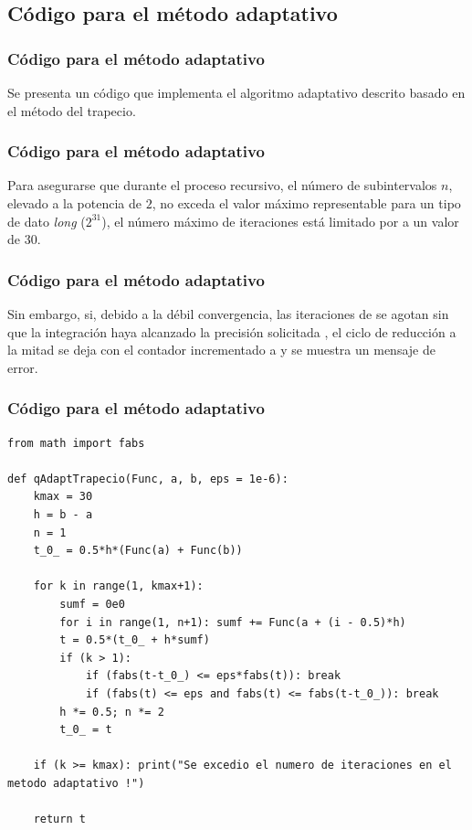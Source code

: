 \subsection*{Código para el método adaptativo}
\begin{frame}
\frametitle{Código para el método adaptativo}
Se presenta un código que implementa el algoritmo adaptativo descrito basado en el método del trapecio.
\end{frame}
\begin{frame}
\frametitle{Código para el método adaptativo}
Para asegurarse que durante el proceso recursivo, el número de subintervalos $n$, elevado a la potencia de $2$, no exceda el valor máximo representable para un tipo de dato \emph{long} ($2^{31}$), el número máximo de iteraciones está limitado por  a un valor de 30.
\end{frame}
\begin{frame}
\frametitle{Código para el método adaptativo}
Sin embargo, si, debido a la débil convergencia, las iteraciones de  se agotan sin que la integración haya alcanzado la precisión solicitada , el ciclo de reducción a la mitad se deja con el contador  incrementado a  y se muestra un mensaje de error.
\end{frame}
\begin{frame}
\frametitle{Código para el método adaptativo}
\begin{lstlisting}[caption=Código para el método adaptativo del trapecio, style=FormattedNumber, basicstyle=\linespread{1.1}\ttfamily=\small, columns=fullflexible]
from math import fabs

def qAdaptTrapecio(Func, a, b, eps = 1e-6):
    kmax = 30
    h = b - a
    n = 1
    t_0_ = 0.5*h*(Func(a) + Func(b))

    for k in range(1, kmax+1):
        sumf = 0e0
        for i in range(1, n+1): sumf += Func(a + (i - 0.5)*h)
        t = 0.5*(t_0_ + h*sumf)
        if (k > 1):
            if (fabs(t-t_0_) <= eps*fabs(t)): break
            if (fabs(t) <= eps and fabs(t) <= fabs(t-t_0_)): break
        h *= 0.5; n *= 2
        t_0_ = t

    if (k >= kmax): print("Se excedio el numero de iteraciones en el metodo adaptativo !")

    return t
\end{lstlisting}
\end{frame}
